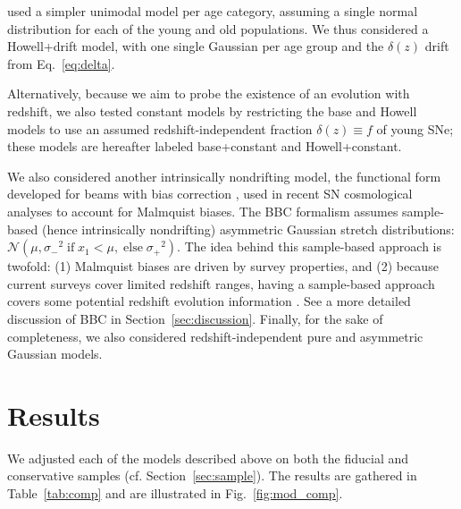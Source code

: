 \documentclass[]{aa}
\begin{document}
\cite{howell2007} used a simpler unimodal model per age category, assuming a
single normal distribution for each of the young and old populations. We thus
considered a Howell+drift model, with one single Gaussian per age group and the
$\delta(z)$ drift from Eq.~\ref{eq:delta}.

Alternatively, because we aim to probe the existence of an evolution with
redshift, we also tested constant models by restricting the base and Howell
models to use an assumed redshift-independent fraction $\delta(z) \equiv f$ of
young SNe; these models are hereafter labeled base+constant and Howell+constant.

We also considered another intrinsically nondrifting model, the functional form
developed for beams with bias correction \cite[BBC,][]{scolnic2016,
kessler2017}, used in recent SN cosmological analyses
\cite[e.g.,][]{scolnic2018a, descosmopaper2019, riess2016, riess2019} to account
for Malmquist biases. The BBC formalism assumes sample-based (hence
intrinsically nondrifting) asymmetric Gaussian stretch distributions:
$\mathcal{N}\left(\mu, \sigma_-{}^2\; \text{if} \;x_1<\mu,\; \text{else}
\;\sigma_+{}^2\right)$. The idea behind this sample-based approach is twofold:
(1) Malmquist biases are driven by survey properties, and (2) because current
surveys cover limited redshift ranges, having a sample-based approach covers
some potential redshift evolution information \citep{scolnic2016, scolnic2018a}.
See a more detailed discussion of BBC in Section~\ref{sec:discussion}. Finally,
for the sake of completeness, we also considered redshift-independent pure and
asymmetric Gaussian models. 

\section{Results}\label{sec:results}

We adjusted each of the models described above on both the fiducial and
conservative samples (cf. Section~\ref{sec:sample}). The results are gathered in
Table~\ref{tab:comp} and are illustrated in Fig.~\ref{fig:mod_comp}. 
\end{document}
